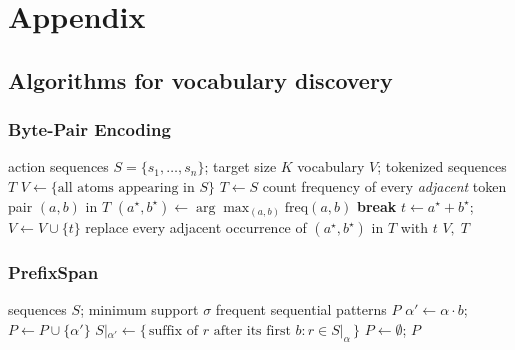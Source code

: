 \documentclass[11pt]{article}
\begin{document}
  
  

  \appendix

  \section{Appendix}

  \subsection{Algorithms for vocabulary discovery}


  \subsubsection{Byte-Pair Encoding}

  \begin{algorithm}[H]
  \caption{BPE vocabulary induction}
  \begin{algorithmic}[1]
  \Require action sequences $S=\{s_1,\dots,s_n\}$; target size $K$
  \Ensure vocabulary $V$; tokenized sequences $T$
  \State $V \gets \{\text{all atoms appearing in } S\}$
  \State $T \gets S$ 
    \State count frequency of every \emph{adjacent} token pair $(a,b)$ in $T$
    \State $(a^\star,b^\star) \gets \arg\max_{(a,b)} \mathrm{freq}(a,b)$
     \textbf{break} \EndIf
    \State $t \gets a^\star\!+\!b^\star$;\quad $V \gets V \cup \{t\}$
    \State replace every adjacent occurrence of $(a^\star,b^\star)$ in $T$ with $t$
  \EndWhile
  \State \Return $V,\;T$
  \end{algorithmic}
  \end{algorithm}

  \subsubsection{PrefixSpan}

  \begin{algorithm}[H]
  \caption{PrefixSpan (single-item event sequences)}
  \begin{algorithmic}[1]
  \Require sequences $S$; minimum support $\sigma$
  \Ensure frequent sequential patterns $P$
      \State $\alpha' \gets \alpha \cdot b$;\quad $P \gets P \cup \{\alpha'\}$
      \State $S|_{\alpha'} \gets \{\, \text{suffix of } r \text{ after its first } b : r \in S|_\alpha \,\}$
      \State {}
    \EndFor
  \EndFunction
  \State $P \gets \emptyset$;\quad {} 
  \State \Return $P$
  \end{algorithmic}
  \end{algorithm}
\end{document}
